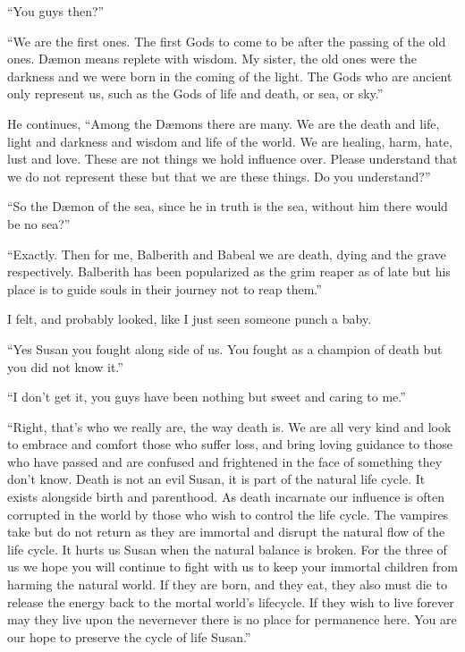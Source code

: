 ``You guys then?''

``We are the first ones. The first Gods to come to be after the passing of the old ones. D\ae mon means replete with wisdom. My sister, the old ones were the darkness and we were born in the coming of the light. The Gods who are ancient only represent us, such as the Gods of life and death, or sea, or sky.''

He continues, ``Among the D\ae mons there are many. We are the death and life, light and darkness and wisdom and life of the world. We are healing, harm, hate, lust and love. These are not things we hold influence over. Please understand that we do not represent these but that we are these things. Do you understand?''

``So the D\ae mon of the sea, since he in truth is the sea, without him there would be no sea?''

``Exactly. Then for me, Balberith and Babeal we are death, dying and the grave respectively. Balberith has been popularized as the grim reaper as of late but his place is to guide souls in their journey not to reap them.''

I felt, and probably looked, like I just seen someone punch a baby.

``Yes Susan you fought along side of us. You fought as a champion of death but you did not know it.''

``I don't get it, you guys have been nothing but sweet and caring to me.''

``Right, that's who we really are, the way death is. We are all very kind and look to embrace and comfort those who suffer loss, and bring loving guidance to those who have passed and are confused and frightened in the face of something they don't know. Death is not an evil Susan, it is part of the natural life cycle. It exists alongside birth and parenthood. As death incarnate our influence is often corrupted in the world by those who wish to control the life cycle. The vampires take but do not return as they are immortal and disrupt the natural flow of the life cycle. It hurts us Susan when the natural balance is broken. For the three of us we hope you will continue to fight with us to keep your immortal children from harming the natural world. If they are born, and they eat, they also must die to release the energy back to the mortal world's lifecycle. If they wish to live forever may they live upon the nevernever there is no place for permanence here. You are our hope to preserve the cycle of life Susan.''

